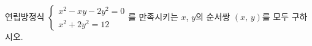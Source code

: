 연립방정식 $\begin{cases} x^2-xy-2y^2=0 \\ x^2+2y^2=12 \end{cases}$를 만족시키는 $x$, $y$의 순서쌍 $(x,\,y)$를 모두 구하시오.
